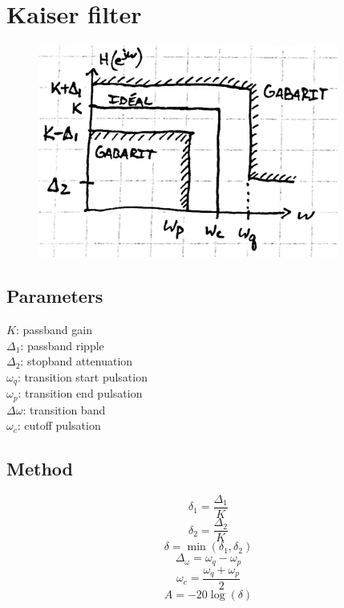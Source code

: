 \documentclass{article}
\begin{document}
\section{Kaiser filter}
\begin{figure}[!ht]
    \includegraphics{kaiser-filter}
\end{figure}

\subsection{Parameters}
$K$: passband gain \\
$\Delta_1$: passband ripple \\
$\Delta_2$: stopband attenuation \\
$\omega_q$: transition start pulsation \\
$\omega_p$: transition end pulsation \\
$\Delta\omega$: transition band \\
$\omega_c$: cutoff pulsation

\subsection{Method}
\begin{equation}
    \delta_1 = \frac{\Delta_1}{K}
\end{equation}
\begin{equation}
    \delta_2 = \frac{\Delta_2}{K}
\end{equation}
\begin{equation}
    \delta = \min\left(\delta_1, \delta_2\right)
\end{equation}
\begin{equation}
    \Delta_\omega = \omega_q - \omega_p
\end{equation}
\begin{equation}
    \omega_c = \frac{\omega_q + \omega_p}{2}
\end{equation}
\begin{equation}
    A = -20\log\left(\delta\right)
\end{equation}
\end{document}
